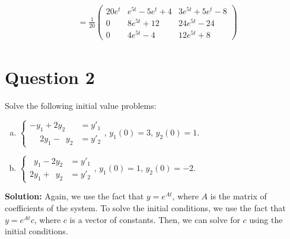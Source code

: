 \documentclass{article}
\begin{document}
\begin{align*}
    &= \frac{1}{20} \begin{pmatrix}20e^t & e^{5t} - 5e^t + 4 & 3e^{5t} + 5e^t - 8 \\ 0 & 8e^{5t} + 12 & 24e^{5t} - 24 \\ 0 & 4e^{5t} - 4 & 12e^{5t} + 8 \end{pmatrix}
\end{align*}

\newpage
\section*{Question 2}
Solve the following initial value problems:
\begin{enumerate}[a.]
    \item $\left\{\begin{aligned}
        -y_1 + 2y_2 &= y'_1 \\
        \phantom{-}2y_1 - \phantom{2}y_2 &= y'_2
    \end{aligned}\right.$, \; $y_1(0) = 3$, \; $y_2(0) = 1$.
    \item $\left\{\begin{aligned}
        \phantom{2}y_1 - 2y_2 &= y'_1 \\
        2y_1 + \phantom{2}y_2 &= y'_2
    \end{aligned}\right.$, \; $y_1(0) = 1$, \; $y_2(0) = -2$.
\end{enumerate}

\vspace{0.25cm}\noindent\textbf{Solution:}
Again, we use the fact that $y = e^{At}$, where $A$ is the matrix of coefficients of the system.
To solve the initial conditions, we use the fact that $y = e^{At}c$, where $c$ is a vector of constants.
Then, we can solve for $c$ using the initial conditions.
\end{document}
